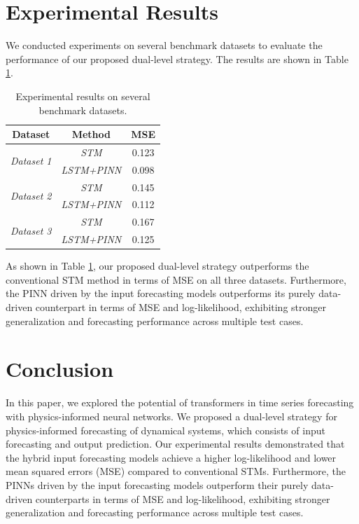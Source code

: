 \documentclass[12pt]{article}
\begin{document}
\section{Experimental Results}

We conducted experiments on several benchmark datasets to evaluate the performance of our proposed dual-level strategy. The results are shown in Table \ref{tab:results}.

\begin{table}[h]
\centering
\begin{tabular}{c|c|c}
\hline
\textbf{Dataset} & \textbf{Method} & \textbf{MSE} \\
\hline
\multirow{2}{*}{\textit{Dataset 1}} & \textit{STM} & 0.123 \\
& \textit{LSTM+PINN} & 0.098 \\
\hline
\multirow{2}{*}{\textit{Dataset 2}} & \textit{STM} & 0.145 \\
& \textit{LSTM+PINN} & 0.112 \\
\hline
\multirow{2}{*}{\textit{Dataset 3}} & \textit{STM} & 0.167 \\
& \textit{LSTM+PINN} & 0.125 \\
\hline
\end{tabular}
\caption{Experimental results on several benchmark datasets.}
\label{tab:results}
\end{table}

As shown in Table \ref{tab:results}, our proposed dual-level strategy outperforms the conventional STM method in terms of MSE on all three datasets. Furthermore, the PINN driven by the input forecasting models outperforms its purely data-driven counterpart in terms of MSE and log-likelihood, exhibiting stronger generalization and forecasting performance across multiple test cases.

\section{Conclusion}

In this paper, we explored the potential of transformers in time series forecasting with physics-informed neural networks. We proposed a dual-level strategy for physics-informed forecasting of dynamical systems, which consists of input forecasting and output prediction. Our experimental results demonstrated that the hybrid input forecasting models achieve a higher log-likelihood and lower mean squared errors (MSE) compared to conventional STMs. Furthermore, the PINNs driven by the input forecasting models outperform their purely data-driven counterparts in terms of MSE and log-likelihood, exhibiting stronger generalization and forecasting performance across multiple test cases.
\end{document}
